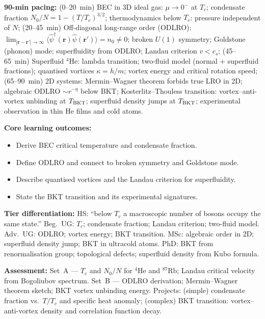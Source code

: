\documentclass[11pt,a4paper]{article}
\begin{document}
\medskip

\begin{tcolorbox}[modulebox, title={Module~II.7 / L04: Bose--Einstein Condensation and Superfluidity}]
\textbf{90-min pacing:} (0--20~min) BEC in 3D ideal gas: $\mu\to 0^-$ at $T_c$; condensate fraction $N_0/N=1-(T/T_c)^{3/2}$; thermodynamics below $T_c$: pressure independent of $N$; (20--45~min) Off-diagonal long-range order (ODLRO): $\lim_{|\mathbf{r}-\mathbf{r}'|\to\infty}\langle\hat\psi^\dagger(\mathbf{r})\hat\psi(\mathbf{r}')\rangle=n_0\neq 0$; broken $U(1)$ symmetry; Goldstone (phonon) mode; superfluidity from ODLRO; Landau criterion $v<c_s$; (45--65~min) Superfluid $^4$He: lambda transition; two-fluid model (normal + superfluid fractions); quantised vortices $\kappa=h/m$; vortex energy and critical rotation speed; (65--90~min) 2D systems: Mermin--Wagner theorem forbids true LRO in 2D; algebraic ODLRO $\sim r^{-\eta}$ below BKT; Kosterlitz--Thouless transition: vortex--anti-vortex unbinding at $T_{\rm BKT}$; superfluid density jumps at $T_{\rm BKT}$; experimental observation in thin He films and cold atoms.

\medskip\textbf{Core learning outcomes:}
\begin{itemize}[leftmargin=1.4em,topsep=2pt,itemsep=1pt]
  \item Derive BEC critical temperature and condensate fraction.
  \item Define ODLRO and connect to broken symmetry and Goldstone mode.
  \item Describe quantised vortices and the Landau criterion for superfluidity.
  \item State the BKT transition and its experimental signatures.
\end{itemize}

\medskip\textbf{Tier differentiation:}
HS: ``below $T_c$ a macroscopic number of bosons occupy the same state.''
Beg.\ UG: $T_c$; condensate fraction; Landau criterion; two-fluid model.
Adv.\ UG: ODLRO; vortex energy; BKT transition.
MSc: algebraic order in 2D; superfluid density jump; BKT in ultracold atoms.
PhD: BKT from renormalisation group; topological defects; superfluid density from Kubo formula.

\medskip\textbf{Assessment:}
Set~A --- $T_c$ and $N_0/N$ for $^4$He and $^{87}$Rb; Landau critical velocity from Bogoliubov spectrum.
Set~B --- ODLRO derivation; Mermin--Wagner theorem sketch; BKT vortex unbinding energy.
Projects: (simple) condensate fraction vs.\ $T/T_c$ and specific heat anomaly;
(complex) BKT transition: vortex--anti-vortex density and correlation function decay.
\end{tcolorbox}
\end{document}
